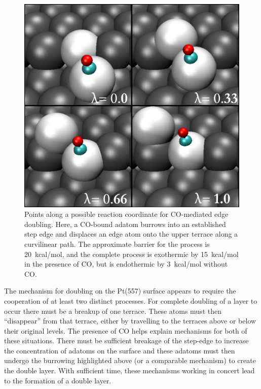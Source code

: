 \documentclass[journal = jpccck, manuscript = article]{achemso}
\begin{document}
\begin{figure}[H]
\includegraphics[width=\linewidth]{EPS_rxnCoord}
\caption{Points along a possible reaction coordinate for CO-mediated
  edge doubling. Here, a CO-bound adatom burrows into an established
  step edge and displaces an edge atom onto the upper terrace along a
  curvilinear path.  The approximate barrier for the process is
  20~kcal/mol, and the complete process is exothermic by 15~kcal/mol
  in the presence of CO, but is endothermic by 3~kcal/mol without CO.}
\label{fig:lambda}
\end{figure}

The mechanism for doubling on the Pt(557) surface appears to require
the cooperation of at least two distinct processes. For complete
doubling of a layer to occur there must be a breakup of one
terrace. These atoms must then ``disappear'' from that terrace, either
by travelling to the terraces above or below their original levels.
The presence of CO helps explain mechanisms for both of these
situations. There must be sufficient breakage of the step-edge to
increase the concentration of adatoms on the surface and these adatoms
must then undergo the burrowing highlighted above (or a comparable
mechanism) to create the double layer.  With sufficient time, these
mechanisms working in concert lead to the formation of a double layer.
\end{document}
